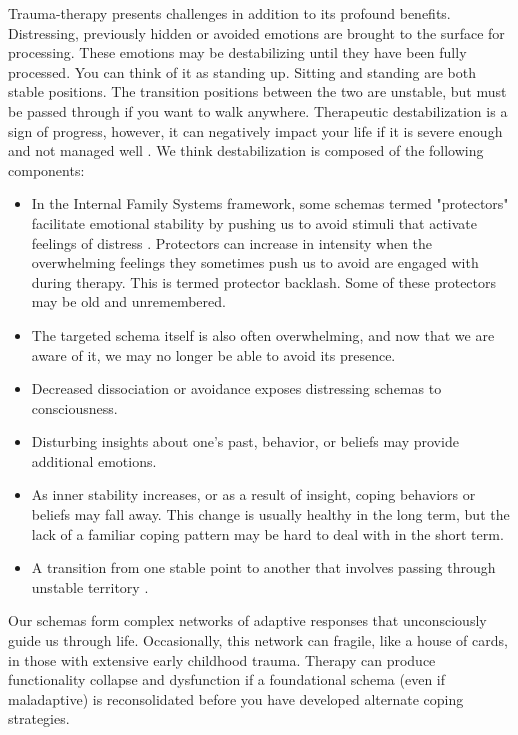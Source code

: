 \documentclass[12pt,letterpaper]{book}
\begin{document}
\label{def:destabilization}
Trauma-therapy presents challenges in addition to its profound benefits. Distressing, previously hidden or avoided emotions are brought to the surface for processing. These emotions may be destabilizing until they have been fully processed. You can think of it as standing up. Sitting and standing are both stable positions. The transition positions between the two are unstable, but must be passed through if you want to walk anywhere. Therapeutic destabilization is a sign of progress, however, it can negatively impact your life if it is severe enough and not managed well \cite{olthofDestabilization}. We think destabilization is composed of the following components:
\begin{itemize}
    \item In the Internal Family Systems framework, some schemas termed "protectors" facilitate emotional stability by pushing us to avoid stimuli that activate feelings of distress \cite{schwartz2019internal}. Protectors can increase in intensity when the overwhelming feelings they sometimes push us to avoid are engaged with during therapy. This is termed protector backlash. Some of these protectors may be old and unremembered.
    \item The targeted schema itself is also often overwhelming, and now that we are aware of it, we may no longer be able to avoid its presence.
    \item Decreased dissociation or avoidance exposes distressing schemas to consciousness.
    \item Disturbing insights about one's past, behavior, or beliefs may provide additional emotions.
    \item As inner stability increases, or as a result of insight, coping behaviors or beliefs may fall away. This change is usually healthy in the long term, but the lack of a familiar coping pattern may be hard to deal with in the short term.
    \item A transition from one stable point to another that involves passing through unstable territory \cite{olthofDestabilization}.
\end{itemize}
Our schemas form complex networks of adaptive responses that unconsciously guide us through life. Occasionally, this network can fragile, like a house of cards, in those with extensive early childhood trauma. Therapy can produce functionality collapse and dysfunction if a foundational schema (even if maladaptive) is reconsolidated before you have developed alternate coping strategies.
\end{document}
